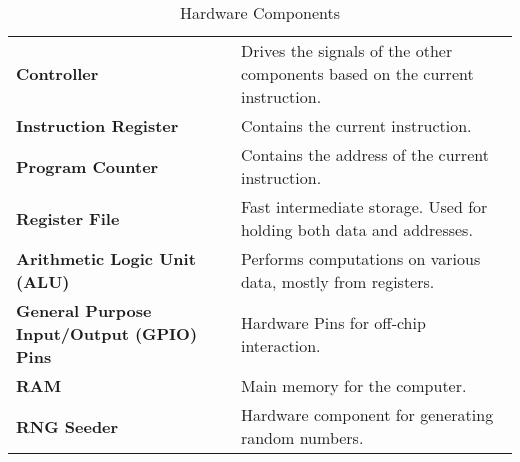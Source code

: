 \newcommand{\hw}[2]{%
	\textbf{#1} & #2 \\%
	\hline%
}
\begin{table}[H]
	\begin{tabularx}{\textwidth}{| a | x |}
		\hline
		 &  \\
		\hline
		\hw{Controller}{Drives the signals of the other components based on the current instruction.}
		\hw{Instruction Register}{Contains the current instruction.}
		\hw{Program Counter}{Contains the address of the current instruction.}
		\hw{Register File}{Fast intermediate storage. Used for holding both data and addresses.}
		\hw{Arithmetic Logic Unit (ALU)}{Performs computations on various data, mostly from registers.}
		\hw{General Purpose Input/Output (GPIO)
		Pins}{Hardware Pins for off-chip interaction.}
		\hw{RAM}{Main memory for the computer.}
		\hw{RNG Seeder}{Hardware component for generating random numbers.}
	\end{tabularx}
	\label{Tab:hardware}
	\caption{Hardware Components}
\end{table}

